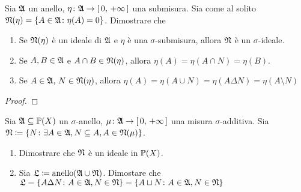 \documentclass[../EserciziIstituzioniAnalisi.tex]{subfiles}
\begin{document}
\begin{exercise}[2016-10-20-1]
  Sia $\mathfrak A$ un anello, $\eta\colon\mathfrak A\to\left[\,0,\,+\infty\,\right]$ una submisura. Sia come al solito $\mathfrak N(\eta)=\left\{A\in\mathfrak A\colon\eta(A)=0\right\}$. Dimostrare che
  \begin{enumerate}
    \item Se $\mathfrak N(\eta)$ è un ideale di $\mathfrak A$ e $\eta$ è una $\sigma$-submisura, allora $\mathfrak N$ è un $\sigma$-ideale.
    \item Se $A,B\in \mathfrak A$ e $A\cap B\in \mathfrak N(\eta)$, allora $\eta(A)=\eta(A\cap N)=\eta(B)$.
    \item Se $A\in \mathfrak A,\, N\in \mathfrak N(\eta)$, allora $\eta(A)=\eta(A\cup N)=\eta(A\Delta N)=\eta(A\setminus N)$
  \end{enumerate}
\end{exercise}
\begin{proof}
  
\end{proof}
\begin{exercise}[2016-10-20-2]
  Sia $\mathfrak A\subseteq\mathbb P(X)$ un $\sigma$-anello, $\mu\colon \mathfrak A\to\left[\,0,\,+\infty\,\right]$ una misura $\sigma$-additiva.
  Sia $\mathfrak N\coloneqq\left\{N\colon\exists A\in \mathfrak A, N\subseteq A, A\in \mathfrak N(\mu)\right\}$.

  \begin{enumerate}
    \item Dimostrare che $\mathfrak N$ è un ideale in $\mathbb P(X)$.
    \item Sia $\mathfrak L\coloneqq\operatorname{anello}(\mathfrak A\cup\mathfrak N)$. Dimostare che $\mathfrak L=\left\{A\Delta N\colon A\in\mathfrak A,N\in\mathfrak N\right\}=\left\{A\sqcup N\colon A\in\mathfrak A,N\in\mathfrak N\right\}$ 
  \end{enumerate}
\end{exercise}
\end{document}
